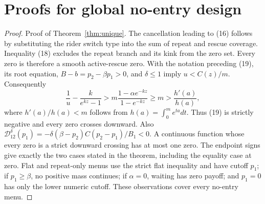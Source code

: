 \documentclass[mnsc,blindrev]{informs3}
\begin{document}
\section{Proofs for global no-entry design}
\label{app:global}

\begin{proof}{Proof of Theorem~\ref{thm:unique}.}
The cancellation leading to (16) follows by substituting the rider switch
type into the sum of repeat and rescue coverage.  Inequality (18) excludes
the repeat branch and its kink from the zero set.  Every zero is therefore a
smooth active-rescue zero.  With the notation preceding (19), its root
equation, $B-b=p_2-\beta p_1>0$, and $\delta\le1$ imply
$u<C(z)/m$.  Consequently
\[
 \frac1u-\frac{k}{e^{kz}-1}
 >m\frac{1-\alpha e^{-kz}}{1-e^{-kz}}
 \ge m>\frac{h'(a)}{h(a)},
\]
where $h'(a)/h(a)<m$ follows from
$h(a)=\int_0^m e^{ta}dt$.  Thus (19) is strictly negative and every zero
crosses downward.  Also
$\mathcal D_{12}^{\delta}(p_1)
=-\delta(\beta-p_2)C(p_2-p_1)/B_1<0$.
A continuous function whose every zero is a strict downward crossing has at
most one zero.  The endpoint signs give exactly the two cases stated in the
theorem, including the equality case at zero.  Flat and repeat-only menus use
the strict flat inequality and have cutoff $p_1$; if $p_1\ge\beta$, no positive
mass continues; if $\alpha=0$, waiting has zero payoff; and $p_1=0$ has only
the lower numeric cutoff.  These observations cover every no-entry menu.
\Halmos\end{proof}
\end{document}
